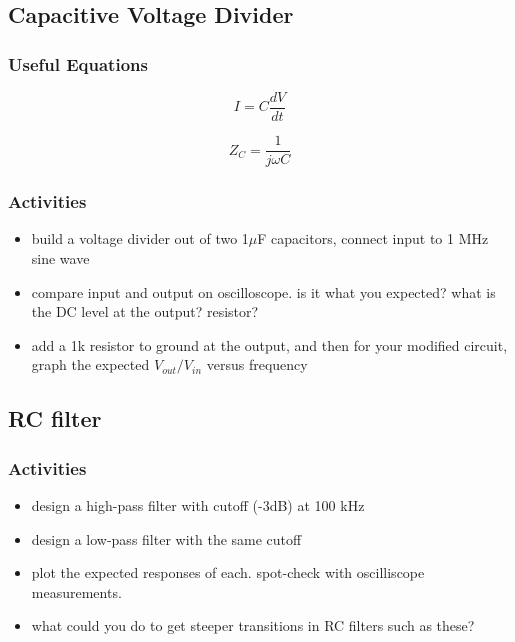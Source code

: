 \documentclass[11pt]{article}
\begin{document}
\subsection{Capacitive Voltage Divider}

\subsubsection{Useful Equations}
\begin{equation}
I=C\frac{dV}{dt}
\end{equation}

\begin{equation}
Z_C = \frac1{j\omega C}
\end{equation}

\subsubsection{Activities}

\begin{itemize}[noitemsep,nolistsep]
\item build a voltage divider out of two 1$\mu$F capacitors, connect input to 1 MHz sine wave
\item compare input and output on oscilloscope.  is it what you expected? what is the DC level at the output?
resistor?
\item add a 1k resistor to ground at the output, and then for your modified circuit, graph the 
expected $V_{out}/V_{in}$ versus frequency
\end{itemize}

\subsection{RC filter}

\subsubsection{Activities}
\begin{itemize}[noitemsep,nolistsep]
\item design a high-pass filter with cutoff (-3dB) at 100 kHz
\item design a low-pass filter with the same cutoff
\item plot the expected responses of each.  spot-check with oscilliscope measurements.
\item what could you do to get steeper transitions in RC filters such as these?
\end{itemize}
\end{document}

